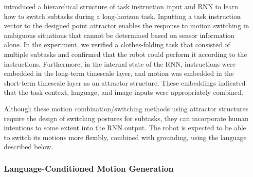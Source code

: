 \cite{Suzuki2018ral} introduced a hierarchical structure of task instruction input and RNN to learn how to switch subtasks during a long-horizon task. Inputting a task instruction vector to the designed point attractor enables the response to motion switching in ambiguous situations that cannot be determined based on sensor information alone. In the experiment, we verified a clothes-folding task that consisted of multiple subtasks and confirmed that the robot could perform it according to the instructions. Furthermore, in the internal state of the RNN, instructions were embedded in the long-term timescale layer, and motion was embedded in the short-term timescale layer as an attractor structure. These embeddings indicated that the task context, language, and image inputs were appropriately combined.


Although these motion combination/switching methods using attractor structures require the design of switching postures for subtasks, they can incorporate human intentions to some extent into the RNN output. The robot is expected to be able to switch its motions more flexibly, combined with grounding, using the language described below.



\subsubsection{Language-Conditioned Motion Generation}

